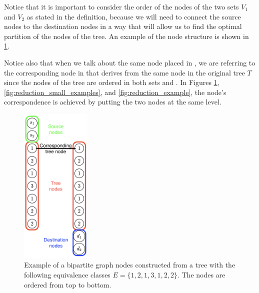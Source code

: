 Notice that it is important to consider the order of the nodes of the two sets $V_1$ and $V_2$ as stated in the definition, because we will need to connect the source nodes to the destination nodes in a way that will allow us to find the optimal partition of the nodes of the tree. An example of the node structure is shown in \cref{fig:reduction_example_parts}.

Notice also that when we talk about the same  node placed in , we are referring to the corresponding node in  that derives from the same node in the original tree $T$ since the nodes of the tree are ordered in both sets  and . In Figures \cref{fig:reduction_example_parts}, \cref{fig:reduction_small_examples}, and \cref{fig:reduction_example}, the node's correspondence is achieved by putting the two nodes at the same level.

\begin{figure}[H]
    \centering
    \includegraphics[width=0.3\textwidth]{Immagini/bipartite_keys_part.png}
    \caption[Bipartite nodes structure]{Example of a bipartite graph nodes constructed from a tree with the following equivalence classes $E = \{1,2,1,3,1,2,2\}$. The nodes are ordered from top to bottom. }
    \label{fig:reduction_example_parts}
\end{figure}

